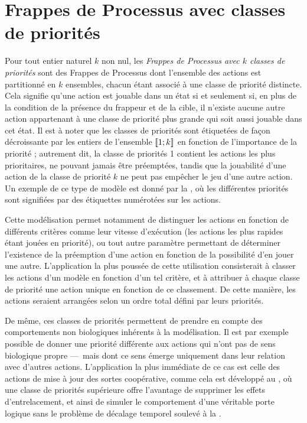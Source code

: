 \section{Frappes de Processus avec classes de priorités}

Pour tout entier naturel $k$ non nul,
les \emph{Frappes de Processus avec $k$ classes de priorités}
sont des Frappes de Processus dont l'ensemble des actions est partitionné
en $k$ ensembles, chacun étant associé à une classe de priorité distincte.
Cela signifie qu'une action est jouable dans un état si et seulement si,
en plus de la condition de la présence du frappeur et de la cible,
il n'existe aucune autre action appartenant à une classe de priorité plus grande
qui soit aussi jouable dans cet état.
Il est à noter que les classes de priorités sont étiquetées de façon décroissante par les entiers de
l'ensemble $\llbracket 1; k \rrbracket$ en fonction de l'importance de la priorité ;
autrement dit, la classe de priorités 1 contient les actions les plus prioritaires,
ne pouvant jamais être préemptées,
tandis que la jouabilité d'une action de la classe de priorité $k$ ne peut pas empêcher le jeu
d'une autre action.
Un exemple de ce type de modèle est donné par la ,
où les différentes priorités sont signifiées par des étiquettes numérotées sur les actions.

Cette modélisation permet notamment de distinguer les actions en fonction 
de différents critères comme
leur vitesse d'exécution (les actions les plus rapides étant jouées en priorité),
ou tout autre paramètre permettant de déterminer l'existence de la préemption d'une action
en fonction de la possibilité d'en jouer une autre.
L'application la plus poussée de cette utilisation consisterait à
classer les actions d'un modèle en fonction d'un tel critère,
et à attribuer à chaque classe de priorité une action unique en fonction de ce classement.
De cette manière,
les actions seraient arrangées selon un ordre total défini par leurs priorités.

De même, ces classes de priorités permettent de prendre en compte des comportements non biologiques
inhérents à la modélisation.
Il est par exemple possible de donner une priorité différente aux
actions qui n'ont pas de sens biologique propre
---~mais dont ce sens émerge uniquement dans leur relation avec d'autres actions.
L'application la plus immédiate de ce cas est celle des actions de mise à jour
des sortes coopérative, comme cela est développé au ,
où une classe de priorités supérieure offre l'avantage de supprimer les effets d'entrelacement,
et ainsi de simuler le comportement d'une véritable porte logique
sans le problème de décalage temporel soulevé à la .

